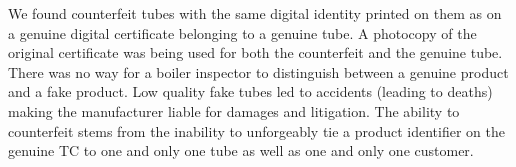 \documentclass{article}
\begin{document}
We found counterfeit tubes with the same digital identity printed on them as on a genuine digital certificate belonging to a genuine tube. A photocopy of the original certificate was being used for both the counterfeit and the genuine tube. %
There was no way for a boiler inspector to distinguish between a genuine product and a fake product. Low quality fake tubes led to accidents (leading to deaths) making the manufacturer liable for damages and litigation. The ability to counterfeit stems from the inability to unforgeably tie a product identifier on the genuine TC to one and only one tube as well as one and only one customer.
\end{document}
